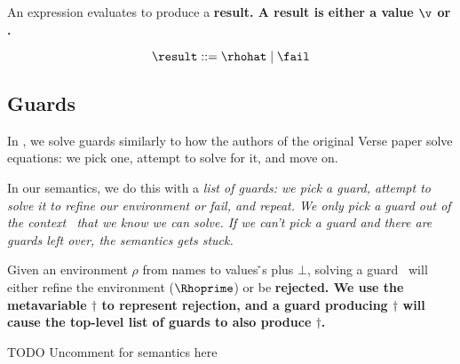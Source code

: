 \documentclass[manuscript,screen,review, 12pt, nonacm]{acmart}
\begin{document}
    An expression evaluates to produce a \bf{result}. A result is either a
    value $\v$ or \fail. 
    
    \[\result\; \rm{::=}\; \rhohat\; \vert \; \fail \]
    
    
    \bigskip
\subsection{Guards}

In {\VMinus}, we solve guards similarly to how the authors of the original Verse
paper solve equations: we pick one, attempt to solve for it, and move on. 

In our semantics, we do this with a \it{list} of guards: we pick a guard,
attempt to solve it to refine our environment or fail, and repeat. We only pick
a guard out of the context \context\ that we know we can solve. If we can't pick
a guard and there are guards left over, the semantics gets stuck.

Given an environment $\rho$ from names to values {\v}s plus $\bot$, solving a
guard \g\ will either refine the environment ($\Rhoprime$) or be \bf{rejected}.
We use the metavariable $\dagger$ to represent rejection, and a guard producing
$\dagger$ will cause the top-level list of guards to also produce $\dagger$. 

    \gfail

TODO Uncomment for semantics here
\vmsemantics
\end{document}
